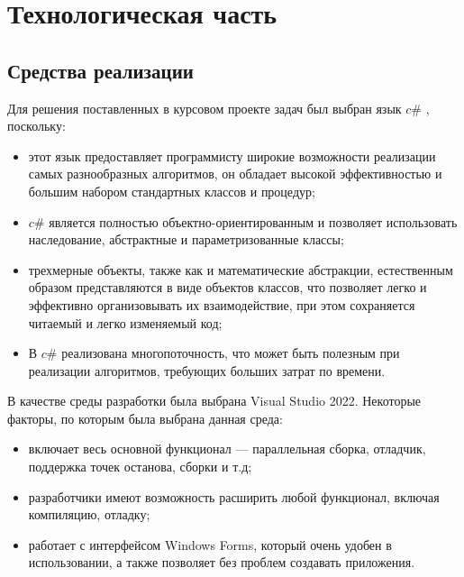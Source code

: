 \chapter{Технологическая часть}
\section{Средства реализации}
Для решения поставленных в курсовом проекте задач был выбран язык $c\#$ \cite{cc}, поскольку:
\begin{itemize}
\item этот язык предоставляет программисту широкие возможности реализации самых разнообразных алгоритмов, он обладает высокой эффективностью и большим набором стандартных классов и процедур;
\item $c\#$ является полностью объектно-ориентированным и позволяет использовать наследование, абстрактные и параметризованные классы;
\item трехмерные объекты, также как и математические абстракции, естественным образом представляются в виде объектов классов, что позволяет легко и эффективно организовывать их взаимодействие, при этом сохраняется читаемый и легко изменяемый код;
\item В $c\#$ реализована многопоточность, что может быть полезным при реализации алгоритмов, требующих больших затрат по времени.
\end{itemize}
В качестве среды разработки была выбрана Visual Studio 2022. Некоторые факторы, по которым была выбрана данная среда:
\begin{itemize}
\item включает весь основной функционал --- параллельная сборка, отладчик, поддержка точек останова, сборки и т.д;
\item разработчики имеют возможность расширить любой функционал, включая компиляцию, отладку;
\item работает с интерфейсом Windows Forms, который очень удобен в использовании, а также позволяет без проблем создавать приложения.
\end{itemize}
